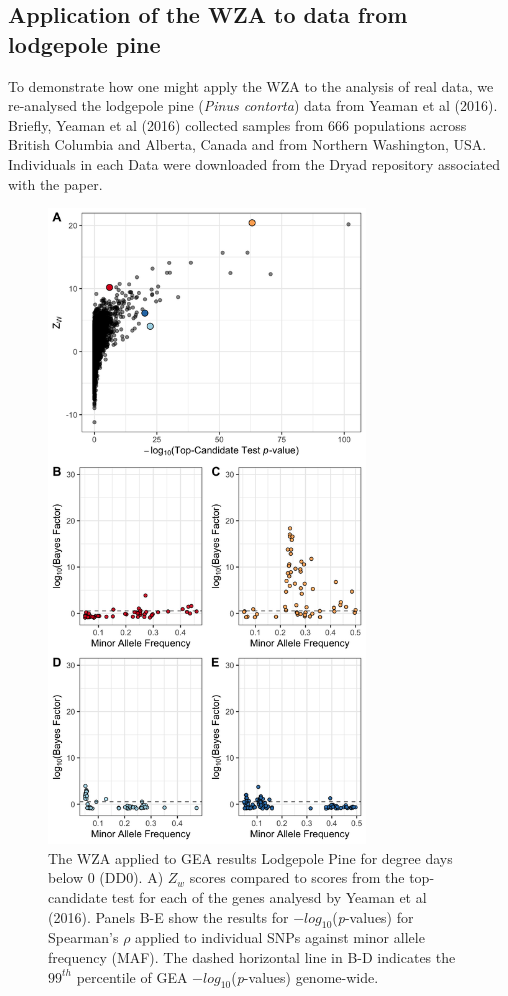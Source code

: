 \documentclass[10pt,twoside,lineno, twocolumn]{GSA_format}
\begin{document}
 
\subsection{Application of the WZA to data from lodgepole pine}

To demonstrate how one might apply the WZA to the analysis of real data, we re-analysed the lodgepole pine (\textit{Pinus contorta}) data from Yeaman et al (2016). Briefly, Yeaman et al (2016) collected samples from 666 populations across British Columbia and Alberta, Canada and from Northern Washington, USA. Individuals in each 
Data were downloaded from the Dryad repository associated with the paper. 

\begin{figure}[H]
  \includegraphics[width=0.75\textwidth,height=0.75\textheight,keepaspectratio]{../dataAnalsis/Z_v_MAF_DD0.png}
  \caption{The WZA applied to GEA results Lodgepole Pine for degree days below 0 (DD0). A) $Z_w$ scores compared to scores from the top-candidate test for each of the genes analyesd by Yeaman et al (2016). Panels B-E show the results for $-log_{10}$(\textit{p}-values) for Spearman's $\rho$ applied to individual SNPs against minor allele frequency (MAF). The dashed horizontal line in B-D indicates the $99^{th}$ percentile of GEA $-log_{10}$(\textit{p}-values) genome-wide.}

  \label{fig:lodgepole}
\end{figure}
\end{document}
